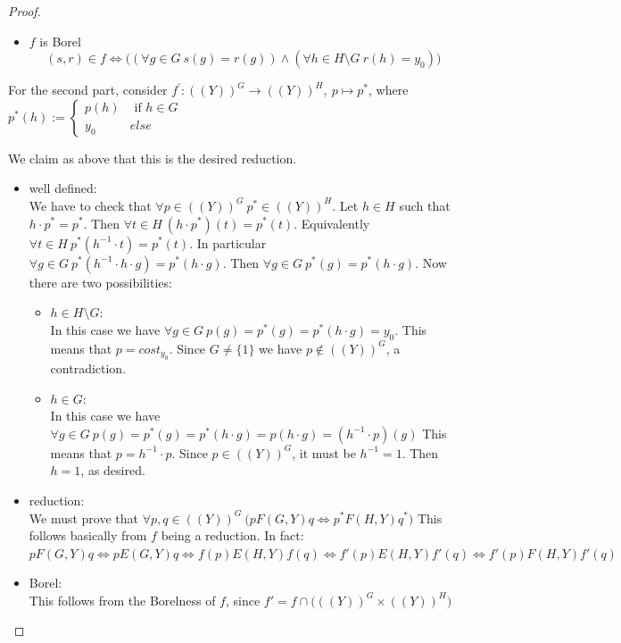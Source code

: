 \documentclass[a4paper,12pt]{article}
\theoremstyle{plain}
\theoremstyle{definition}
\theoremstyle{remark}
\begin{document}
\begin{proof}
\begin{itemize}
		\item $f$ is Borel \\
			\[
				(s,r) \in f \iff \bigg( (\forall g \in G \ s(g) = r(g)) \land (\forall h \in H \setminus G \ r(h) = y_0) \bigg)
			\]

	\end{itemize}

	For the second part, consider $f^{'}: ((Y))^G \to ((Y))^H, \ p \mapsto p^{*}$, where 
	$p^{*}(h) := 
	\begin{cases}
		p(h) & \text{ if } h \in G  \\
		y_0  & else
	\end{cases}
	$

	We claim as above that this is the desired reduction. 

	\begin{itemize}
		\item well defined: \\
			We have to check that 
			$\forall p \in ((Y))^G \ p^{*} \in ((Y))^{H}$.
			Let $h \in H$ such that $h \cdot p^{*} = p^{*}$.
			Then $\forall t \in H \ (h \cdot p^{*})(t) = p^{*}(t)$.
			Equivalently $\forall t \in H \ p^{*}(h^{-1} \cdot t) = p^{*}(t)$.
			In particular $\forall g \in G \ p^{*}(h^{-1} \cdot h \cdot g) = p^{*}(h \cdot g)$.
			Then $\forall g \in G \ p^{*}(g) = p^{*}(h \cdot g)$.
			Now there are two possibilities:
			\begin{itemize}
				\item $h \in H \setminus G$: \\
					In this case we have 
					$\forall g \in G \ p(g) = p^{*}(g) = p^{*}(h \cdot g) = y_0$.
					This means that $p = cost_{y_0}$.
					Since $G \not = \{1\}$ we have $p \not \in ((Y))^{G}$, a contradiction.
				\item $h \in G$: \\
					In this case we have 
					$\forall g \in G \ p(g) = p^{*}(g) = p^{*}(h \cdot g) = p(h \cdot g) = (h^{-1} \cdot p)(g)$
					This means that $p = h^{-1} \cdot p$.
					Since $p \in ((Y))^{G}$, it must be $h^{-1} = 1$. Then $h = 1$, as desired.
			\end{itemize}
		\item reduction: \\
			We must prove that $\forall p,q \in ((Y))^G \ \bigg( p F(G,Y) q \iff p^{*} F(H,Y) q^{*} \bigg)$
			This follows basically from $f$ being a reduction.
			In fact:
			$p F(G,Y) q \iff p E(G,Y) q \iff f(p) E(H,Y) f(q)
					\iff f'(p) E(H,Y) f'(q) \iff f'(p) F(H,Y) f'(q)$

		\item Borel: \\
			This follows from the Borelness of $f$, since
			$f' = f \cap \bigg( ((Y))^G \times ((Y))^H \bigg)$
	\end{itemize}

\end{proof}
\end{document}
